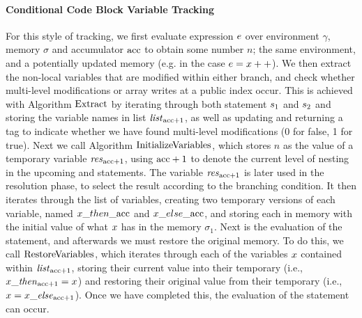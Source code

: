 \paragraph{Conditional Code Block Variable Tracking}
For this style of tracking, we first evaluate expression $e$ over environment $\gamma$, memory $\sigma$ and accumulator $\mathrm{acc}$ 
to obtain some number $n$; the same environment, 
and a potentially updated memory (e.g. in the case $e = x++$). 
We then extract the non-local variables that are modified within either branch, and check whether multi-level modifications or array writes at a public index occur. This is achieved with Algorithm $\mathrm{ Extract}$ by iterating through both statement $s_1$ and $s_2$ and storing the variable names in list $\mathit{list}_{\mathrm{acc}+1}$, as well as updating and returning a tag to indicate whether we have found multi-level modifications (0 for false, 1 for true).
%
Next we call Algorithm $\mathrm{InitializeVariables}$, which 
stores $n$ as the value of a temporary variable $\mathit{res}_{\mathrm{acc}+1}$, using $\mathrm{acc} +1$ to denote the current level of nesting in the upcoming  and  statements. The variable $\mathit{res}_{\mathrm{acc}+1}$  is later used in the resolution phase, to select the result according to the branching condition. 
It then iterates through the list of variables, creating two temporary versions of each variable, named $x\_{then\_\mathrm{acc}}$ and $x\_{else\_\mathrm{acc}}$, and storing each in memory with the initial value of what $x$ has in the memory $\sigma_1$. 
%
Next is the evaluation of the  statement, and afterwards 
%
%
we must restore the original memory. %
To do this, we call $\mathrm{RestoreVariables}$, which iterates through each of the variables $x$ contained within $\mathit{list}_{\mathrm{acc}+1}$, storing their current value into their  temporary (i.e., $x\_\mathit{then}_{\mathrm{acc}+1} = x$) and restoring their original value from their  temporary (i.e., $x = x\_\mathit{else}_{\mathrm{acc}+1}$). 
Once we have completed this, 
%
 the evaluation of the  statement can occur. 
 
